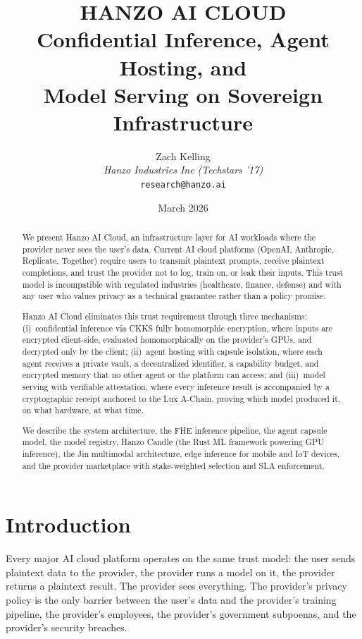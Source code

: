 \documentclass[11pt]{article}
\title{HANZO AI CLOUD\\[0.3em]
{\large Confidential Inference, Agent Hosting, and\\Model Serving on Sovereign Infrastructure}}
\author{
    Zach Kelling \\
    \textit{Hanzo Industries Inc (Techstars '17)} \\
    \texttt{research@hanzo.ai}
}
\date{March 2026}
\begin{document}
\hanzocoverpage

\begin{abstract}
We present Hanzo AI Cloud, an infrastructure layer for AI workloads where the
provider never sees the user's data. Current AI cloud platforms (OpenAI,
Anthropic, Replicate, Together) require users to transmit plaintext prompts,
receive plaintext completions, and trust the provider not to log, train on, or
leak their inputs. This trust model is incompatible with regulated industries
(healthcare, finance, defense) and with any user who values privacy as a
technical guarantee rather than a policy promise.

Hanzo AI Cloud eliminates this trust requirement through three mechanisms:
(i)~confidential inference via CKKS fully homomorphic encryption, where inputs
are encrypted client-side, evaluated homomorphically on the provider's GPUs,
and decrypted only by the client; (ii)~agent hosting with capsule isolation,
where each agent receives a private vault, a decentralized identifier, a
capability budget, and encrypted memory that no other agent or the platform
can access; and (iii)~model serving with verifiable attestation, where every
inference result is accompanied by a cryptographic receipt anchored to the Lux
A-Chain, proving which model produced it, on what hardware, at what time.

We describe the system architecture, the FHE inference pipeline, the agent
capsule model, the model registry, Hanzo Candle (the Rust ML framework
powering GPU inference), the Jin multimodal architecture, edge inference for
mobile and IoT devices, and the provider marketplace with stake-weighted
selection and SLA enforcement.
\end{abstract}

\section{Introduction}
\label{sec:intro}

Every major AI cloud platform operates on the same trust model: the user sends
plaintext data to the provider, the provider runs a model on it, the provider
returns a plaintext result. The provider sees everything. The provider's
privacy policy is the only barrier between the user's data and the provider's
training pipeline, the provider's employees, the provider's government
subpoenas, and the provider's security breaches.
\end{document}
